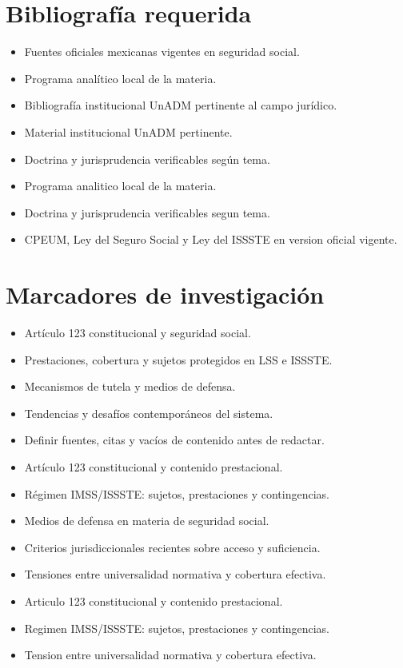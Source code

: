 \documentclass[12pt]{article}
\begin{document}
\section*{Bibliografía requerida}
\begin{itemize}[leftmargin=*]
  \item Fuentes oficiales mexicanas vigentes en seguridad social.
  \item Programa analítico local de la materia.
  \item Bibliografía institucional UnADM pertinente al campo jurídico.
  \item Material institucional UnADM pertinente.
  \item Doctrina y jurisprudencia verificables según tema.
  \item Programa analitico local de la materia.
  \item Doctrina y jurisprudencia verificables segun tema.
  \item CPEUM, Ley del Seguro Social y Ley del ISSSTE en version oficial vigente.
\end{itemize}

\section*{Marcadores de investigación}
\begin{itemize}[leftmargin=*]
  \item Artículo 123 constitucional y seguridad social.
  \item Prestaciones, cobertura y sujetos protegidos en LSS e ISSSTE.
  \item Mecanismos de tutela y medios de defensa.
  \item Tendencias y desafíos contemporáneos del sistema.
  \item Definir fuentes, citas y vacíos de contenido antes de redactar.
  \item Artículo 123 constitucional y contenido prestacional.
  \item Régimen IMSS/ISSSTE: sujetos, prestaciones y contingencias.
  \item Medios de defensa en materia de seguridad social.
  \item Criterios jurisdiccionales recientes sobre acceso y suficiencia.
  \item Tensiones entre universalidad normativa y cobertura efectiva.
  \item Articulo 123 constitucional y contenido prestacional.
  \item Regimen IMSS/ISSSTE: sujetos, prestaciones y contingencias.
  \item Tension entre universalidad normativa y cobertura efectiva.
\end{itemize}
\end{document}
